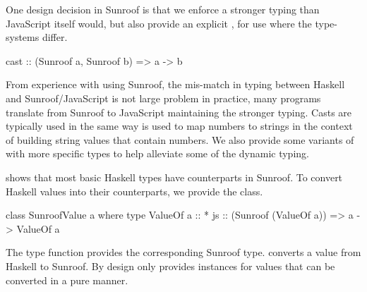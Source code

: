 One design decision in Sunroof is that we enforce a stronger typing
than JavaScript itself would, but also provide an explicit ,
for use where the type-systems differ.
\begin{Code}
cast :: (Sunroof a, Sunroof b) => a -> b
\end{Code}
From experience with using Sunroof,
the mis-match in typing between Haskell and Sunroof/JavaScript
is not large problem in practice,
many programs translate from Sunroof to JavaScript
maintaining the stronger typing.
Casts are typically used in the same way  is used
to map numbers to strings in the context of building
string values that contain numbers. We also provide
some variants of  with more specific types
to help alleviate some of the dynamic typing.

 shows that most basic 
Haskell types have counterparts in
Sunroof. To convert Haskell values into their 
counterparts, we provide the  class.
\begin{Code}
class SunroofValue a where
  type ValueOf a :: *
  js :: (Sunroof (ValueOf a)) => a -> ValueOf a
\end{Code}
The type function
 \cite{Chakravarty:05:AssociatedTypeSynonyms} 
provides the corresponding Sunroof type.
 converts a value from Haskell to Sunroof. 
By design  
only provides instances for values that can be converted in a pure
manner. 



